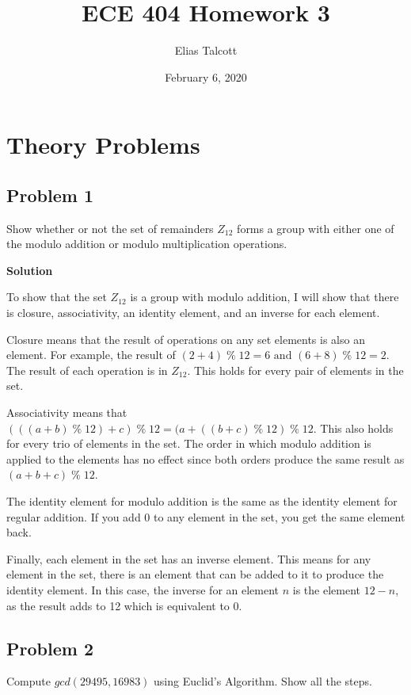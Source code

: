 \documentclass[11pt]{article}
\def \myTitle {ECE 404 Homework 3}
\def \myName {Elias Talcott}
\def \myDate {February 6, 2020}
\begin{document}
\begin{titlepage}
\title{\myTitle}
\author{\myName}
\date{\myDate}
\maketitle
\vspace{1in}
\tableofcontents
\thispagestyle{empty}
\end{titlepage}

\section{Theory Problems}

\subsection{Problem 1}
Show whether or not the set of remainders $Z_{12}$ forms a group with either one of the modulo addition or modulo multiplication operations.

\textbf{Solution}

To show that the set $Z_{12}$ is a group with modulo addition, I will show that there is closure, associativity, an identity element, and an inverse for each element.

Closure means that the result of operations on any set elements is also an element. For example, the result of $(2+4)\; \%\; 12 = 6 \textrm{ and } (6+8)\; \%\; 12 = 2$. The result of each operation is in $Z_{12}$. This holds for every pair of elements in the set.

Associativity means that $(((a+b)\; \%\; 12) + c)\; \%\; 12 = (a + ((b+c)\; \%\; 12)\; \%\; 12$. This also holds for every trio of elements in the set. The order in which modulo addition is applied to the elements has no effect since both orders produce the same result as $(a+b+c)\; \%\; 12$.

The identity element for modulo addition is the same as the identity element for regular addition. If you add 0 to any element in the set, you get the same element back.

Finally, each element in the set has an inverse element. This means for any element in the set, there is an element that can be added to it to produce the identity element. In this case, the inverse for an element $n$ is the element $12-n$, as the result adds to 12 which is equivalent to 0.

\subsection{Problem 2}
Compute $gcd(29495, 16983)$ using Euclid's Algorithm. Show all the steps.
\end{document}
